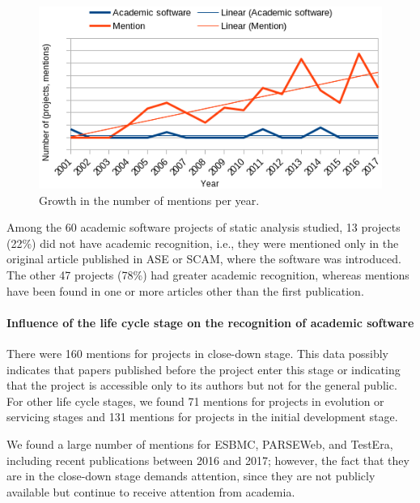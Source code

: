 \begin{figure}[ht]
  \center
  \includegraphics[scale=0.59]{figs/mentions-trend.png}
  \caption{Growth in the number of mentions per year.}
  \label{mentions-trend}
\end{figure}

Among the 60 academic software projects of static analysis studied, 13 projects
(22\%) did not have academic recognition, i.e., they were mentioned only in
the original article published in ASE or SCAM, where the software was introduced. The
other 47 projects (78\%) had greater academic recognition, whereas mentions
have been found in one or more articles other than the first publication.

\paragraph{\bf Influence of the life cycle stage on the recognition of academic
software} There were 160 mentions for projects in close-down stage.
This data
possibly indicates that papers published before the project enter this stage or
indicating that the project is accessible only to its authors but not for the
general public.
%
For other life cycle stages, we found 71 mentions for projects
in evolution or servicing stages and 131 mentions for projects in the initial
development stage.

We found a large number of mentions for ESBMC, PARSEWeb,
and TestEra, including recent publications
between 2016 and 2017; however, the fact that they are in the close-down stage
demands attention, since they are not publicly available but continue to
receive attention from academia.
